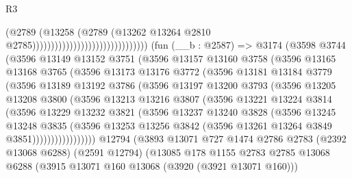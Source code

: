 \begin{lexlean}{R3}
\begin{coremodule}
                                                          (@2789
                                                            (@13258
                                                              (@2789
                                                                (@13262
                                                                  @13264
                                                                  @2810
                                                                  @2785)))))))))))))))))))))))))))))))
    (fun (__b : @2587) =>
    @3174
      (@3598
        @3744
        (@3596
          @13149
          @13152
          @3751
          (@3596
            @13157
            @13160
            @3758
            (@3596
              @13165
              @13168
              @3765
              (@3596
                @13173
                @13176
                @3772
                (@3596
                  @13181
                  @13184
                  @3779
                  (@3596
                    @13189
                    @13192
                    @3786
                    (@3596
                      @13197
                      @13200
                      @3793
                      (@3596
                        @13205
                        @13208
                        @3800
                        (@3596
                          @13213
                          @13216
                          @3807
                          (@3596
                            @13221
                            @13224
                            @3814
                            (@3596
                              @13229
                              @13232
                              @3821
                              (@3596
                                @13237
                                @13240
                                @3828
                                (@3596
                                  @13245
                                  @13248
                                  @3835
                                  (@3596
                                    @13253
                                    @13256
                                    @3842
                                    (@3596 @13261 @13264 @3849 @3851)))))))))))))))))
    @12794
    (@3893
      @13071
      @727
      @1474
      @2786
      @2783
      (@2392 @13068 @6288)
      (@2591 @12794)
      (@13085
        @178
        @1155
        @2783
        @2785
        @13068
        @6288
        (@3915 @13071 @160 @13068 (@3920 (@3921 @13071 @160)))

\end{coremodule}
\end{lexlean}
